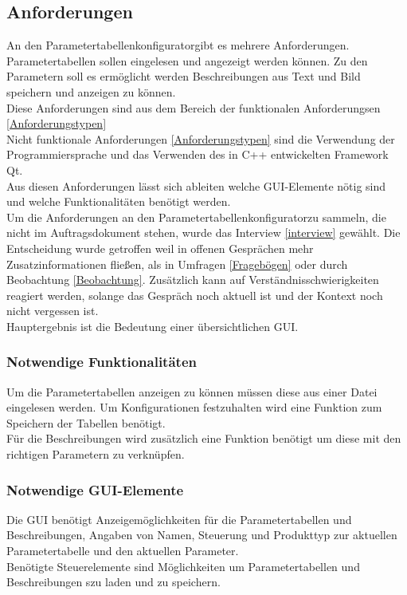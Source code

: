 \documentclass[12pt,a4paper]{article}
\begin{document}
\subsection{Anforderungen}
\label{Anfs} 
An den \glqq Parametertabellenkonfigurator\grqq\space gibt es mehrere Anforderungen. \\
Parametertabellen sollen eingelesen und angezeigt werden können. Zu den Parametern soll es ermöglicht werden Beschreibungen aus Text und Bild speichern und anzeigen zu können.\\
Diese Anforderungen sind aus dem Bereich der funktionalen Anforderungsen \ref{Anforderungstypen}\\
Nicht funktionale Anforderungen \ref{Anforderungstypen} sind die Verwendung der Programmiersprache und das Verwenden des in C++ entwickelten Framework Qt.\\
Aus diesen Anforderungen lässt sich ableiten welche \ac{GUI}-Elemente nötig sind und welche Funktionalitäten benötigt werden.\\
Um die Anforderungen an den \glqq Parametertabellenkonfigurator\grqq\space zu sammeln, die nicht im Auftragsdokument stehen, wurde das Interview \ref{interview} gewählt. Die Entscheidung wurde getroffen weil in offenen Gesprächen mehr Zusatzinformationen fließen, als in Umfragen \ref{Fragebögen} oder durch Beobachtung \ref{Beobachtung}. Zusätzlich kann auf Verständnisschwierigkeiten reagiert werden, solange das Gespräch noch aktuell ist und der Kontext noch nicht vergessen ist.\\
Hauptergebnis ist die Bedeutung einer übersichtlichen \ac{GUI}.
\subsubsection{Notwendige Funktionalitäten}
Um die Parametertabellen anzeigen zu können müssen diese aus einer Datei eingelesen werden. Um Konfigurationen festzuhalten wird eine Funktion zum Speichern der Tabellen benötigt. \\
Für die Beschreibungen wird zusätzlich eine Funktion benötigt um diese mit den richtigen Parametern zu verknüpfen. \\
\subsubsection{Notwendige GUI-Elemente}
Die \ac{GUI} benötigt Anzeigemöglichkeiten für die Parametertabellen und Beschreibungen, Angaben von Namen, Steuerung und Produkttyp zur aktuellen Parametertabelle und den aktuellen Parameter.\\
Benötigte Steuerelemente sind Möglichkeiten um Parametertabellen und Beschreibungen szu laden und zu speichern. 
\end{document}
